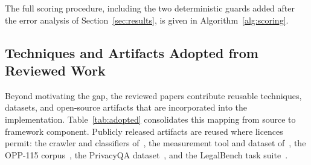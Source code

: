 \documentclass[conference]{IEEEtran}
\begin{document}
The full scoring procedure, including the two deterministic guards added after the error analysis of Section~\ref{sec:results}, is given in Algorithm~\ref{alg:scoring}.

\subsection{Techniques and Artifacts Adopted from Reviewed Work}
\label{sec:adopted}
Beyond motivating the gap, the reviewed papers contribute reusable techniques, datasets, and open-source artifacts that are incorporated into the implementation. Table~\ref{tab:adopted} consolidates this mapping from source to framework component. Publicly released artifacts are reused where licences permit: the crawler and classifiers of~\cite{bouhoula-2024-cookies}, the measurement tool and dataset of~\cite{trevisan-2019-cookielaw}, the OPP-115 corpus~\cite{wilson-2016-opp115}, the PrivacyQA dataset~\cite{ravichander-2019-privacyqa}, and the LegalBench task suite~\cite{guha-2023-legalbench}.
\end{document}

